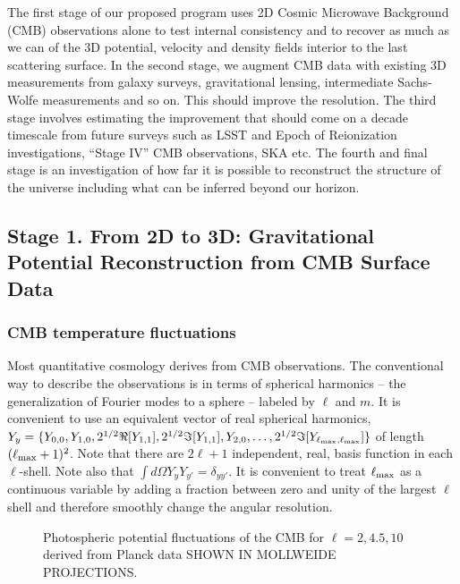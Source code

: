 \documentclass[psfig,11pt]{article}
\begin{document}
The first stage of our proposed program uses 2D Cosmic Microwave Background (CMB) observations alone to test internal consistency and to recover as much as we can of the 3D potential, velocity and density fields interior to the last scattering surface. In the second stage, we augment CMB data with existing 3D measurements from galaxy surveys, gravitational lensing, intermediate Sachs-Wolfe measurements and so on. This should improve the resolution. The third stage involves estimating the improvement that should come on a decade timescale from future surveys such as LSST and Epoch of Reionization investigations, ``Stage IV'' CMB observations, SKA etc. The fourth and final stage is an investigation of how far it is possible to reconstruct the structure of the universe including what can be inferred beyond our horizon.


\subsection{Stage 1. From 2D to 3D: Gravitational Potential Reconstruction from CMB Surface Data}

\subsubsection{CMB temperature fluctuations}

Most quantitative cosmology derives from CMB observations. The conventional way to describe the observations is in terms of spherical harmonics -- the generalization of Fourier modes to a sphere -- labeled by $\ell$ and $m$. It is convenient to use an equivalent vector of real spherical harmonics, $Y_y=\{Y_{0,0},Y_{1,0},2^{1/2}\Re[Y_{1,1}],2^{1/2}\Im[Y_{1,1}],Y_{2,0},\dots,2^{1/2}\Im[Y_{\ell_{\rm max},\ell_{\rm max}}]\}$ of length $(\ell_{\rm max}+1)^2$. Note that there are $2\ell+1$ independent, real, basis function in each $\ell$-shell. Note also that $\int d\Omega Y_yY_{y'}=\delta_{yy'}$. It is convenient to treat $\ell_{\rm max}$ as a continuous variable by adding a fraction between zero and unity of the largest $\ell$ shell and therefore smoothly change the angular resolution.
\begin{figure}[t]
\centering
\caption{Photospheric potential fluctuations of the CMB for $\ell=2,4.5,10$ derived from Planck data SHOWN IN MOLLWEIDE PROJECTIONS.}
\end{figure}
\end{document}
